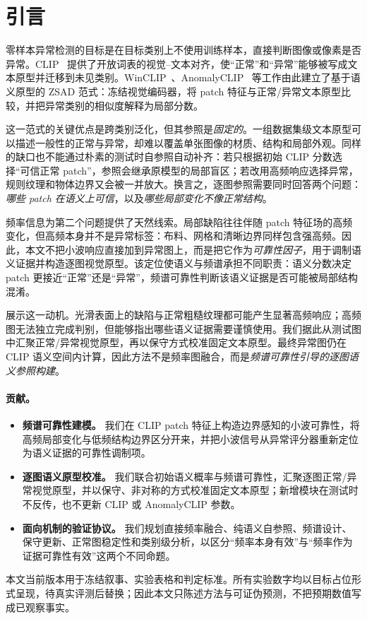 \section{引言}
\label{sec:intro}

零样本异常检测的目标是在目标类别上不使用训练样本，直接判断图像或像素是否异常。CLIP~\cite{radford2021clip} 提供了开放词表的视觉--文本对齐，使“正常”和“异常”能够被写成文本原型并迁移到未见类别。WinCLIP~\cite{jeong2023winclip}、AnomalyCLIP~\cite{zhou2024anomalyclip} 等工作由此建立了基于语义原型的 ZSAD 范式：冻结视觉编码器，将 patch 特征与正常/异常文本原型比较，并把异常类别的相似度解释为局部分数。

这一范式的关键优点是跨类别泛化，但其参照是\emph{固定的}。一组数据集级文本原型可以描述一般性的正常与异常，却难以覆盖单张图像的材质、结构和局部外观。同样的缺口也不能通过朴素的测试时自参照自动补齐：若只根据初始 CLIP 分数选择“可信正常 patch”，参照会继承原模型的局部盲区；若改用高频响应选择异常，规则纹理和物体边界又会被一并放大。换言之，逐图参照需要同时回答两个问题：\emph{哪些 patch 在语义上可信}，以及\emph{哪些局部变化不像正常结构}。

频率信息为第二个问题提供了天然线索。局部缺陷往往伴随 patch 特征场的高频变化，但高频本身并不是异常标签：布料、网格和清晰边界同样包含强高频。因此，本文不把小波响应直接加到异常图上，而是把它作为\emph{可靠性因子}，用于调制语义证据并构造逐图视觉原型。该定位使语义与频谱承担不同职责：语义分数决定 patch 更接近“正常”还是“异常”，频谱可靠性判断该语义证据是否可能被局部结构混淆。

 展示这一动机。光滑表面上的缺陷与正常粗糙纹理都可能产生显著高频响应；高频图无法独立完成判别，但能够指出哪些语义证据需要谨慎使用。我们据此从测试图中汇聚正常/异常视觉原型，再以保守方式校准固定文本原型。最终异常图仍在 CLIP 语义空间内计算，因此方法不是频率图融合，而是\emph{频谱可靠性引导的逐图语义参照构建}。



\paragraph{贡献。}
\begin{itemize}[leftmargin=1.4em,itemsep=0.15em,topsep=0.2em]
\item \textbf{频谱可靠性建模。} 我们在 CLIP patch 特征上构造边界感知的小波可靠性，将高频局部变化与低频结构边界区分开来，并把小波信号从异常评分器重新定位为语义证据的可靠性调制项。
\item \textbf{逐图语义原型校准。} 我们联合初始语义概率与频谱可靠性，汇聚逐图正常/异常视觉原型，并以保守、非对称的方式校准固定文本原型；新增模块在测试时不反传，也不更新 CLIP 或 AnomalyCLIP 参数。
\item \textbf{面向机制的验证协议。} 我们规划直接频率融合、纯语义自参照、频谱设计、保守更新、正常图稳定性和类别级分析，以区分“频率本身有效”与“频率作为证据可靠性有效”这两个不同命题。
\end{itemize}

本文当前版本用于冻结叙事、实验表格和判定标准。所有实验数字均以目标占位形式呈现，待真实评测后替换；因此本文只陈述方法与可证伪预测，不把预期数值写成已观察事实。
